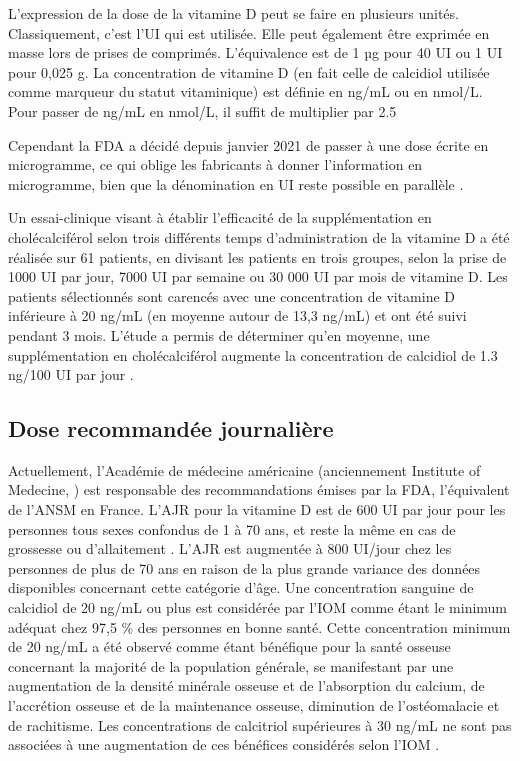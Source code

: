 \documentclass[
  a4paper,
  DIV=11,
  numbers=noendperiod,
  listof=totoc]{scrreprt}
\begin{document}
L'expression de la dose de la vitamine D peut se faire en plusieurs
unités. Classiquement, c'est l'\ac{UI} qui est utilisée. Elle peut
également être exprimée en masse lors de prises de comprimés.
L'équivalence est de 1 µg pour 40 \ac{UI} ou 1 \ac{UI} pour 0,025 g. La
concentration de vitamine D (en fait celle de calcidiol utilisée comme
marqueur du statut vitaminique) est définie en ng/mL ou en nmol/L. Pour
passer de ng/mL en nmol/L, il suffit de multiplier par 2.5
\autocite{Pramyothin.2012}

Cependant la \ac{FDA} a décidé depuis janvier 2021 de passer à une dose
écrite en microgramme, ce qui oblige les fabricants à donner
l'information en microgramme, bien que la dénomination en UI reste
possible en parallèle \autocite{HHS.2016}.

Un essai-clinique visant à établir l'efficacité de la supplémentation en
cholécalciférol selon trois différents temps d'administration de la
vitamine D a été réalisée sur 61 patients, en divisant les patients en
trois groupes, selon la prise de 1000 UI par jour, 7000 UI par semaine
ou 30 000 UI par mois de vitamine D. Les patients sélectionnés sont
carencés avec une concentration de vitamine D inférieure à 20 ng/mL (en
moyenne autour de 13,3 ng/mL) et ont été suivi pendant 3 mois. L'étude a
permis de déterminer qu'en moyenne, une supplémentation en
cholécalciférol augmente la concentration de calcidiol de 1.3 ng/100 UI
par jour \autocite{Takács.2017}.

\hypertarget{dose-recommanduxe9e-journaliuxe8re}{%
\subsection{Dose recommandée
journalière}\label{dose-recommanduxe9e-journaliuxe8re}}

Actuellement, l'Académie de médecine américaine (anciennement Institute
of Medecine, ) est responsable des recommandations émises par
la \ac{FDA}, l'équivalent de l'\ac{ANSM} en France. L'\ac{AJR} pour la
vitamine D est de 600 UI par jour pour les personnes tous sexes
confondus de 1 à 70 ans, et reste la même en cas de grossesse ou
d'allaitement \autocite{IOM.2011}. L'\ac{AJR} est augmentée à 800
UI/jour chez les personnes de plus de 70 ans en raison de la plus grande
variance des données disponibles concernant cette catégorie d'âge. Une
concentration sanguine de calcidiol de 20 ng/mL ou plus est considérée
par l'\ac{IOM} comme étant le minimum adéquat chez 97,5 \% des personnes
en bonne santé. Cette concentration minimum de 20 ng/mL a été observé
comme étant bénéfique pour la santé osseuse concernant la majorité de la
population générale, se manifestant par une augmentation de la densité
minérale osseuse et de l'absorption du calcium, de l'accrétion osseuse
et de la maintenance osseuse, diminution de l'ostéomalacie et de
rachitisme. Les concentrations de calcitriol supérieures à 30 ng/mL ne
sont pas associées à une augmentation de ces bénéfices considérés selon
l'\ac{IOM} \autocite{IOM.2011,Rosen.IOM.2012}.
\end{document}
